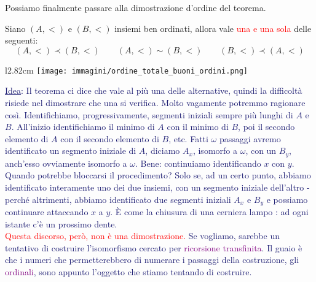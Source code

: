 \documentclass[11pt]{scrartcl}
\begin{document}
Possiamo finalmente passare alla dimostrazione d'ordine del teorema.

\begin{theorem}
	Siano $(A,<)$ e $(B,<)$ insiemi ben ordinati, allora vale \textcolor{red}{una e una sola} delle seguenti:
	\[ (A,<) \prec (B,<) \qquad (A,<) \sim (B,<) \qquad (B,<) \prec (A,<)
		\]
\end{theorem}

\begin{wrapfigure}[12]{l}{2.82cm}
	\texttt{[image: immagini/ordine\_totale\_buoni\_ordini.png]}
\end{wrapfigure}

\textcolor{MidnightBlue}{\underline{Idea}: Il teorema ci dice che vale al più una delle alternative, quindi la difficoltà risiede nel dimostrare che una si verifica. Molto vagamente potremmo ragionare così.
Identifichiamo, progressivamente, segmenti iniziali sempre più lunghi di $A$ e $B$. All'inizio identifichiamo il minimo di $A$ con il minimo di $B$, poi il secondo elemento di $A$ con il secondo elemento di $B$, etc. Fatti $\omega$
passaggi avremo identificato un segmento iniziale di $A$, diciamo $A_x$, isomorfo a $\omega$, con un $B_y$, anch'esso ovviamente isomorfo a $\omega$. Bene: continuiamo identificando $x$ con $y$. Quando potrebbe bloccarsi il procedimento?
Solo se, ad un certo punto, abbiamo identificato interamente uno dei due insiemi, con un segmento iniziale dell'altro - perché altrimenti, abbiamo identificato due segmenti iniziali $A_x$ e $B_y$ e possiamo continuare attaccando $x$ a $y$. È 
come la chiusura di una cerniera lampo : ad ogni istante c'è un prossimo dente.\\
\textcolor{red}{Questa discorso, però, non è una dimostrazione.} Se vogliamo, sarebbe un tentativo di costruire l'isomorfismo cercato per \textcolor{purple}{ricorsione transfinita}. Il guaio è che i numeri che permetterebbero di numerare i passaggi della costruzione,
gli \textcolor{purple}{ordinali}, sono appunto l'oggetto che stiamo tentando di costruire.}
\end{document}
